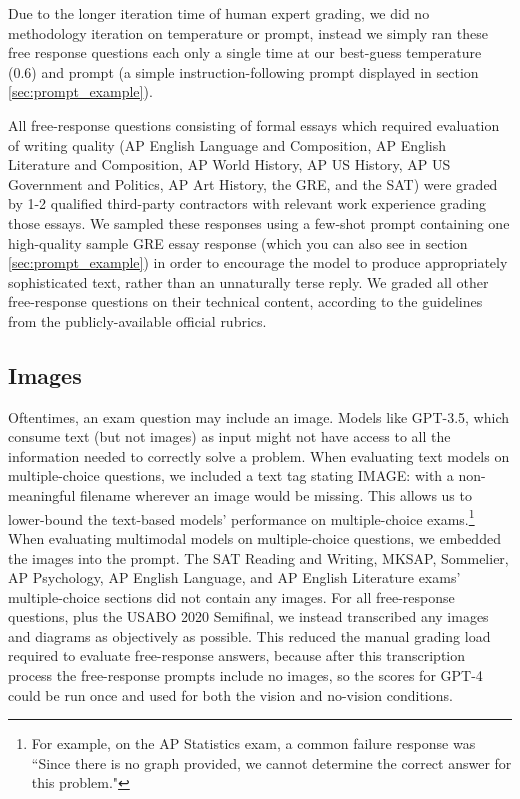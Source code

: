 \documentclass{article}
\begin{document}
Due to the longer iteration time of human expert grading, we did no methodology iteration on temperature or prompt, instead we simply ran these free response questions each only a single time at our best-guess temperature (0.6) and prompt (a simple instruction-following prompt displayed in section \ref{sec:prompt_example}).

All free-response questions consisting of formal essays which required evaluation of writing quality (AP English Language and Composition, AP English Literature and Composition, AP World History, AP US History, AP US Government and Politics, AP Art History, the GRE, and the SAT) were graded by 1-2 qualified third-party contractors with relevant work experience grading those essays. We sampled these responses using a few-shot prompt containing one high-quality sample GRE essay response (which you can also see in section \ref{sec:prompt_example}) in order to encourage the model to produce appropriately sophisticated text, rather than an unnaturally terse reply. We graded all other free-response questions on their technical content, according to the guidelines from the publicly-available official rubrics.

\subsection{Images}
Oftentimes, an exam question may include an image. Models like GPT-3.5, which consume text (but not images) as input might not have access to all the information needed to correctly solve a problem. When evaluating text models on multiple-choice questions, we included a text tag stating IMAGE: with a non-meaningful filename wherever an image would be missing. This allows us to lower-bound the text-based models' performance on multiple-choice exams.\footnote{For example, on the AP Statistics exam, a common failure response was ``Since there is no graph provided, we cannot determine the correct answer for this problem."} When evaluating multimodal models on multiple-choice questions, we embedded the images into the prompt. The SAT Reading and Writing, MKSAP, Sommelier, AP Psychology, AP English Language, and AP English Literature exams' multiple-choice sections did not contain any images. For all free-response questions, plus the USABO 2020 Semifinal, we instead transcribed any images and diagrams as objectively as possible. This reduced the manual grading load required to evaluate free-response answers, because after this transcription process the free-response prompts include no images, so the scores for GPT-4 could be run once and used for both the vision and no-vision conditions.
\end{document}
